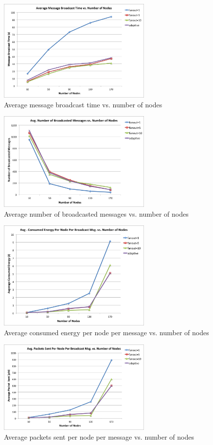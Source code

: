 \begin{figure}
	\centering
	\includegraphics[width=3in]{brTime.png}
	\caption{Average message broadcast time vs. number of nodes}
	\label{fig:brTime}
\end{figure}

\begin{figure}
	\centering
	\includegraphics[width=3in]{brNum.png}
	\caption{Average number of broadcasted messages vs. number of nodes}
	\label{fig:brNum}
\end{figure}

\begin{figure}
	\centering
	\includegraphics[width=3in]{energy.png}
	\caption{Average consumed energy per node per message vs. number of nodes}
	\label{fig:energy}
\end{figure}

\begin{figure}
	\centering
	\includegraphics[width=3in]{overhead.png}
	\caption{Average packets sent per node per message vs. number of nodes}
	\label{fig:overhead}
\end{figure}

